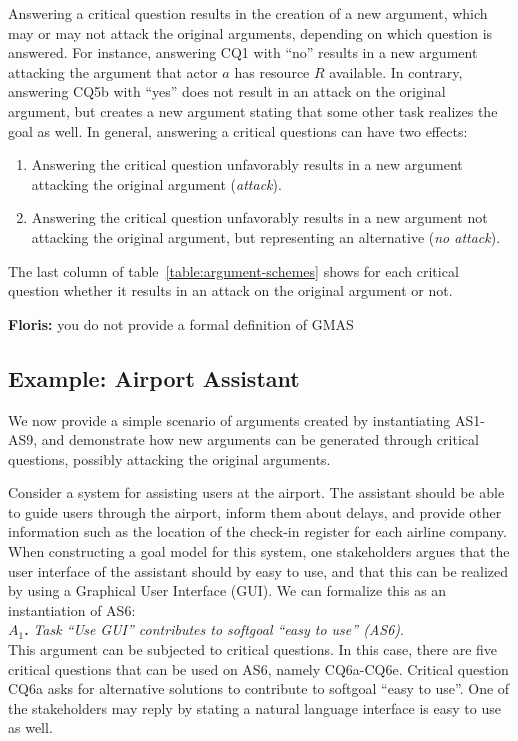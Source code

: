\documentclass[11.5pt,two column]{llncs}
\newcommand{\floris}[1]{{\color{red}\textbf{Floris: }#1}}
\begin{document}
Answering a critical question results in the creation of a new argument, which may or may not attack the original arguments, depending on which question is answered. For instance, answering CQ1 with ``no'' results in a new argument attacking the argument that actor $a$ has resource $R$ available. In contrary, answering CQ5b with ``yes'' does not result in an attack on the original argument, but creates a new argument stating that some other task realizes the goal as well. In general, answering a critical questions can have two effects:
\begin{enumerate}
\item
Answering the critical question unfavorably results in a new argument attacking the original argument (\emph{attack}).
\item
Answering the critical question unfavorably results in a new argument not attacking the original argument, but representing an alternative (\emph{no attack}).
\end{enumerate}
The last column of table~\ref{table:argument-schemes} shows for each critical question whether it results in an attack on the original argument or not. 

\floris{you do not provide a formal definition of GMAS}

\subsection{Example: Airport Assistant}

We now provide a simple scenario of arguments created by instantiating AS1-AS9, and demonstrate how new arguments can be generated through critical questions, possibly attacking the original arguments.

Consider a system for assisting users at the airport. The assistant should be able to guide users through the airport, inform them about delays, and provide other information such as the location of the check-in register for each airline company. When constructing a goal model for this system, one stakeholders argues that the user interface of the assistant should by easy to use, and that this can be realized by using a Graphical User Interface (GUI). We can formalize this as an instantiation of AS6:\\

\noindent
\textbf{$A_1$.} \emph{Task ``Use GUI'' contributes to softgoal ``easy to use'' (AS6)}.\\

\noindent
This argument can be subjected to critical questions. In this case, there are five critical questions that can be used on AS6, namely CQ6a-CQ6e. Critical question CQ6a asks for alternative solutions to contribute to softgoal ``easy to use''. One of the stakeholders may reply by stating a natural language interface is easy to use as well.\\
\end{document}
